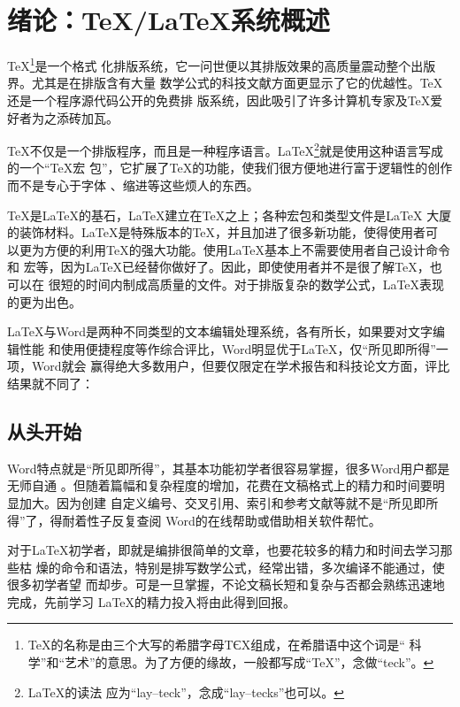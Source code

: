 \chapter{绪论：\TeX/\LaTeX{}系统概述}
\label{cha:overview}

\TeX{}\footnote{\TeX{}的名称是由三个大写的希腊字母ΤЄΧ组成，在希腊语中这个词是“
科学”和“艺术”的意思。为了方便的缘故，一般都写成“TeX”，念做“teck”。}是一个格式
化排版系统，它一问世便以其排版效果的高质量震动整个出版界。尤其是在排版含有大量
数学公式的科技文献方面更显示了它的优越性。\TeX{}还是一个程序源代码公开的免费排
版系统，因此吸引了许多计算机专家及\TeX{}爱好者为之添砖加瓦。

\TeX{}不仅是一个排版程序，而且是一种程序语言。\LaTeX{}\footnote{\LaTeX{}的读法
应为“lay--teck”，念成“lay--tecks”也可以。}就是使用这种语言写成的一个“\TeX{}宏
包”，它扩展了\TeX{}的功能，使我们很方便地进行富于逻辑性的创作而不是专心于字体
、缩进等这些烦人的东西。

\TeX{}是\LaTeX{}的基石，\LaTeX{}建立在\TeX{}之上；各种宏包和类型文件是\LaTeX{}
大厦的装饰材料。\LaTeX{}是特殊版本的\TeX{}，并且加进了很多新功能，使得使用者可
以更为方便的利用\TeX{}的强大功能。使用\LaTeX{}基本上不需要使用者自己设计命令和
宏等，因为\LaTeX{}已经替你做好了。因此，即使使用者并不是很了解\TeX{}，也可以在
很短的时间内制成高质量的文件。对于排版复杂的数学公式，\LaTeX{}表现的更为出色。

\LaTeX{}与Word是两种不同类型的文本编辑处理系统，各有所长，如果要对文字编辑性能
和使用便捷程度等作综合评比，Word明显优于\LaTeX{}，仅“所见即所得”一项，Word就会
赢得绝大多数用户，但要仅限定在学术报告和科技论文方面，评比结果就不同了：

\section*{从头开始}

Word特点就是“所见即所得”，其基本功能初学者很容易掌握，很多Word用户都是无师自通
。但随着篇幅和复杂程度的增加，花费在文稿格式上的精力和时间要明显加大。因为创建
自定义编号、交叉引用、索引和参考文献等就不是“所见即所得”了，得耐着性子反复查阅
Word的在线帮助或借助相关软件帮忙。

对于\LaTeX{}初学者，即就是编排很简单的文章，也要花较多的精力和时间去学习那些枯
燥的命令和语法，特别是排写数学公式，经常出错，多次编译不能通过，使很多初学者望
而却步。可是一旦掌握，不论文稿长短和复杂与否都会熟练迅速地完成，先前学习
\LaTeX{}的精力投入将由此得到回报。

